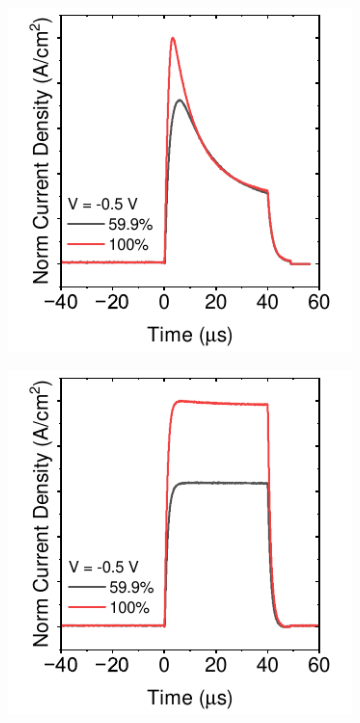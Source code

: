 \begin{figure}[htbp]
    \begin{subfigure}[b]{0.28\textwidth}
        \centering
        \includegraphics[width=\textwidth]{chapters/material_properties/images/TPC-08CsBr.pdf}
        \caption{}
    \end{subfigure}
    \hfill
    \begin{subfigure}[b]{0.28\textwidth}
        \centering
        \includegraphics[width=\textwidth]{chapters/material_properties/images/TPC-105CsBr.pdf}

\end{subfigure}
\end{figure}
